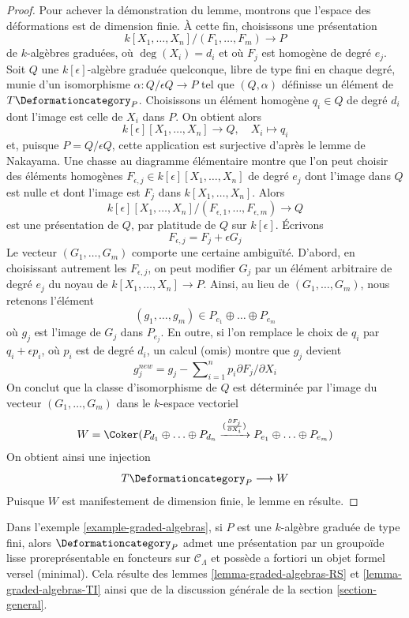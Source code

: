 \begin{proof}
\medskip\noindent
Pour achever la démonstration du lemme, montrons que l'espace des déformations
est de dimension finie. À cette fin, choisissons
une présentation
$$
k[X_1, \ldots, X_n]/(F_1, \ldots, F_m) \longrightarrow P
$$
de $k$-algèbres graduées, où $\deg(X_i) = d_i$ et où
$F_j$ est homogène de degré $e_j$.
Soit $Q$ une $k[\epsilon]$-algèbre graduée quelconque,
libre de type fini en chaque degré, munie d'un isomorphisme
$\alpha : Q/\epsilon Q \to P$ tel que $(Q, \alpha)$ définisse
un élément de $T\Deformationcategory_P$.
Choisissons un élément homogène $q_i \in Q$ de degré $d_i$
dont l'image est celle de $X_i$ dans $P$.
On obtient alors
$$
k[\epsilon][X_1, \ldots, X_n] \longrightarrow Q,\quad
X_i \longmapsto q_i
$$
et, puisque $P = Q/\epsilon Q$, cette application est surjective d'après le lemme de Nakayama.
Une chasse au diagramme élémentaire montre que l'on peut choisir des éléments homogènes
$F_{\epsilon, j} \in k[\epsilon][X_1, \ldots, X_n]$ de degré $e_j$
dont l'image dans $Q$ est nulle et dont l'image est $F_j$ dans $k[X_1, \ldots, X_n]$.
Alors
$$
k[\epsilon][X_1, \ldots, X_n]/(F_{\epsilon, 1}, \ldots, F_{\epsilon, m})
\longrightarrow Q
$$
est une présentation de $Q$, par platitude de $Q$ sur $k[\epsilon]$.
Écrivons
$$
F_{\epsilon, j} =  F_j + \epsilon G_j
$$
Le vecteur $(G_1, \ldots, G_m)$ comporte une certaine ambiguïté.
D'abord, en choisissant autrement les $F_{\epsilon, j}$,
on peut modifier $G_j$ par un élément arbitraire de degré $e_j$
du noyau de $k[X_1, \ldots, X_n] \to P$.
Ainsi, au lieu de $(G_1, \ldots, G_m)$, nous retenons
l'élément
$$
(g_1, \ldots, g_m) \in P_{e_1} \oplus \ldots \oplus P_{e_m}
$$
où $g_j$ est l'image de $G_j$ dans $P_{e_j}$.
En outre, si l'on remplace le choix de $q_i$ par $q_i + \epsilon p_i$,
où $p_i$ est de degré $d_i$, un calcul (omis) montre
que $g_j$ devient
$$
g_j^{new} = g_j - \sum\nolimits_{i = 1}^n p_i \partial F_j / \partial X_i
$$
On conclut que la classe d'isomorphisme de $Q$ est déterminée par
l'image du vecteur $(G_1, \ldots, G_m)$ dans le $k$-espace vectoriel
$$
W  = \Coker(P_{d_1} \oplus \ldots \oplus P_{d_n}
\xrightarrow{(\frac{\partial F_j}{\partial X_i})}
P_{e_1} \oplus \ldots \oplus P_{e_m})
$$
On obtient ainsi une injection
$$
T\Deformationcategory_P \longrightarrow W
$$
Puisque $W$ est manifestement de dimension finie, le lemme en résulte.
\end{proof}

\noindent
Dans l'exemple \ref{example-graded-algebras}, si $P$ est une $k$-algèbre graduée
de type fini, alors $\Deformationcategory_P$
admet une présentation par un groupoïde lisse proreprésentable en foncteurs
sur $\mathcal{C}_\Lambda$
et possède a fortiori un objet formel versel (minimal). Cela résulte
des lemmes \ref{lemma-graded-algebras-RS} et
\ref{lemma-graded-algebras-TI}
ainsi que de la discussion générale de la section \ref{section-general}.

